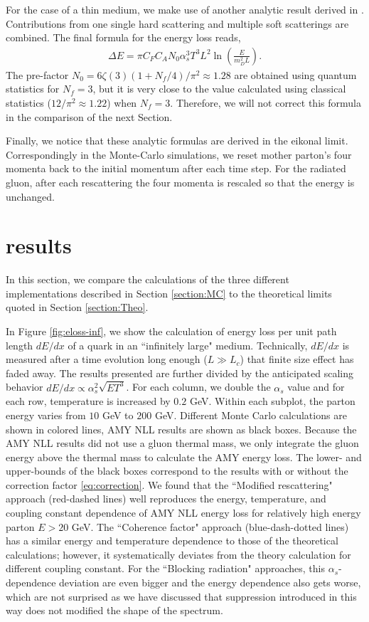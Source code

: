 \documentclass[aps, prc, reprint, amsmath, groupedaddress, nofootinbib]{revtex4-1}
\begin{document}
For the case of a thin medium, we make use of another analytic result derived in \cite{Arnold:2009mr}. 
Contributions from one single hard scattering and multiple soft scatterings are combined. The final formula for the energy loss reads,
\begin{eqnarray}\label{eq:dE-thin}
\Delta E = \pi C_F C_A N_0 \alpha_s^3 T^3 L^2 \ln\left(\frac{E}{m_D^2 L}\right).
\end{eqnarray}
The pre-factor $N_0 = 6\zeta(3)(1+N_f/4)/\pi^2 \approx 1.28$ 
are obtained using quantum statistics for $N_f=3$, but it is very close to the value calculated using classical statistics ($12/\pi^2 \approx 1.22$) when $N_f=3$.
Therefore, we will not correct this formula in the comparison of the next Section.

Finally, we notice that these analytic formulas are derived in the eikonal limit.
Correspondingly in the Monte-Carlo simulations, we reset mother parton's four momenta back to the initial momentum after each time step. 
For the radiated gluon, after each rescattering the four momenta is rescaled so that the energy is unchanged.


\section{results}\label{section:results}
In this section, we compare the calculations of the three different implementations described in Section \ref{section:MC} to the theoretical limits quoted in Section \ref{section:Theo}. 

In Figure \ref{fig:eloss-inf}, we show the calculation of energy loss per unit path length $dE/dx$ of a quark in an ``infinitely large" medium. 
Technically, $dE/dx$ is measured after a time evolution long enough ($L\gg L_c$) that finite size effect has faded away.
The results presented are further divided by the anticipated scaling behavior $dE/dx \propto \alpha_s^2 \sqrt{ET^3}$.
For each column, we double the $\alpha_s$ value and for each row, temperature is increased by $0.2$ GeV. 
Within each subplot, the parton energy varies from $10$ GeV to $200$ GeV.
Different Monte Carlo calculations are shown in colored lines, AMY NLL results are shown as black boxes. 
Because the AMY NLL results did not use a gluon thermal mass, we only integrate the gluon energy above the thermal mass to calculate the AMY energy loss. 
The lower- and upper-bounds of the black boxes correspond to the results with or without the correction factor \ref{eq:correction}.
We found that the ``Modified rescattering" approach (red-dashed lines) well reproduces the energy, temperature, and coupling constant dependence of AMY NLL energy loss for relatively high energy parton $E>20$ GeV.
The ``Coherence factor" approach (blue-dash-dotted lines) has a similar energy and temperature dependence to those of the theoretical calculations; however, it systematically deviates from the theory calculation for different coupling constant.
For the ``Blocking radiation" approaches, this $\alpha_s$-dependence deviation are even bigger and the energy dependence also gets worse, which are not surprised as we have discussed that suppression introduced in this way does not modified the shape of the spectrum.
\end{document}
